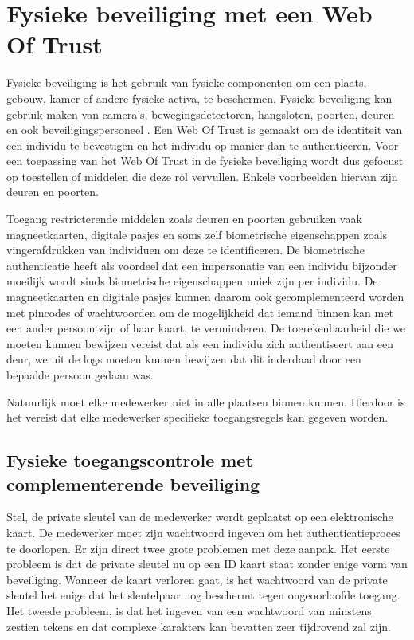 \chapter{Fysieke beveiliging met een Web Of Trust}
\label{ch:fysieke-beveiliging-met-een-wot}

Fysieke beveiliging is het gebruik van fysieke componenten om een plaats,
gebouw, kamer of andere fysieke activa, te beschermen. Fysieke beveiliging kan
gebruik maken van camera’s, bewegingsdetectoren, hangsloten, poorten, deuren en
ook beveiligingspersoneel \autocite{FennellyPhysicalSecurity}. Een Web Of Trust
is gemaakt om de identiteit van een individu te bevestigen en het individu op
manier dan te authenticeren. Voor een toepassing van het Web Of Trust in de
fysieke beveiliging wordt dus gefocust op toestellen of middelen die deze rol
vervullen. Enkele voorbeelden hiervan zijn deuren en poorten.

Toegang restricterende middelen zoals deuren en poorten gebruiken vaak
magneetkaarten, digitale pasjes en soms zelf biometrische eigenschappen zoals
vingerafdrukken van individuen om deze te identificeren. De biometrische
authenticatie heeft als voordeel dat een impersonatie van een individu bijzonder
moeilijk wordt sinds biometrische eigenschappen uniek zijn per individu. De
magneetkaarten en digitale pasjes kunnen daarom ook gecomplementeerd worden met
pincodes of wachtwoorden om de mogelijkheid dat iemand binnen kan met een ander
persoon zijn of haar kaart, te verminderen. De toerekenbaarheid die we moeten
kunnen bewijzen vereist dat als een individu zich authentiseert aan een deur, we
uit de logs moeten kunnen bewijzen dat dit inderdaad door een bepaalde persoon
gedaan was.

Natuurlijk moet elke medewerker niet in alle plaatsen binnen kunnen. Hierdoor is
het vereist dat elke medewerker specifieke toegangsregels kan gegeven worden.

\section{Fysieke toegangscontrole met complementerende beveiliging}
\label{sec:fysieke-toegangscontrole-met-complementerende-beveiliging}

Stel, de private sleutel van de medewerker wordt geplaatst op een elektronische
kaart. De medewerker moet zijn wachtwoord ingeven om het authenticatieproces te
doorlopen. Er zijn direct twee grote problemen met deze aanpak. Het eerste
probleem is dat de private sleutel nu op een ID kaart staat zonder enige vorm
van beveiliging. Wanneer de kaart verloren gaat, is het wachtwoord van de
private sleutel het enige dat het sleutelpaar nog beschermt tegen ongeoorloofde
toegang. Het tweede probleem, is dat het ingeven van een wachtwoord van minstens
zestien tekens en dat complexe karakters kan bevatten zeer tijdrovend zal zijn.

